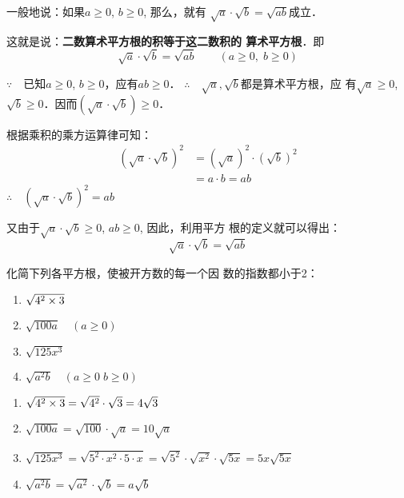一般地说：如果$a\ge 0$, $b\ge 0$, 那么，就有
$\sqrt{a}\cdot \sqrt{b}=\sqrt{ab}$成立．

这就是说：\textbf{二数算术平方根的积等于这二数积的
算术平方根}．即
\[\sqrt{a}\cdot \sqrt{b}=\sqrt{ab}\qquad (a\ge 0,\; b\ge 0)\]

\begin{note}
    $\because\quad$已知$a\ge 0$, $b\ge 0$，应有$ab\ge 0$．
$\therefore\quad \sqrt{a},\sqrt{b}$都是算术平方根，应
有$\sqrt{a}\ge 0$, $\sqrt{b}\ge 0$．因而$(\sqrt{a}\cdot \sqrt{b})\ge 0$．

根据乘积的乘方运算律可知：
\begin{align*}
    (\sqrt{a}\cdot \sqrt{b})^2 &= (\sqrt{a})^2\cdot (\sqrt{b})^2\\
    &=a\cdot b=ab \tag{算术平方根的性质}
\end{align*}
$\therefore\quad \left(\sqrt{a}\cdot \sqrt{b}\right)^2=ab$

又由于$\sqrt{a}\cdot\sqrt{b}\ge 0$, $ab\ge0$, 因此，利用平方
根的定义就可以得出：
\[\sqrt{a}\cdot\sqrt{b}=\sqrt{ab}\]
\end{note}

\begin{example}
化简下列各平方根，使被开方数的每一个因
数的指数都小于2：
\begin{multicols}{2}
\begin{enumerate}
    \item $\sqrt{4^2\times3}$
    \item $\sqrt{100a}\quad (a\ge 0)$
    \item $\sqrt{125x^3}$
    \item $\sqrt{a^2b}\quad (a\ge 0\; b\ge 0)$
\end{enumerate}
\end{multicols}
\end{example}

\begin{solution}
\begin{enumerate}
\item $\sqrt{4^2\times3}=\sqrt{4^2}\cdot \sqrt{3}=4\sqrt{3}$
    \item $\sqrt{100a}=\sqrt{100}\cdot \sqrt{a}=10\sqrt{a} $
    \item $\sqrt{125x^3}=\sqrt{5^2\cdot x^2\cdot 5\cdot x}=\sqrt{5^2}\cdot \sqrt{x^2}\cdot \sqrt{5x}=5x\sqrt{5x}$
    \item $\sqrt{a^2b}=\sqrt{a^2}\cdot \sqrt{b}=a\sqrt{b} $
\end{enumerate}
\end{solution}

